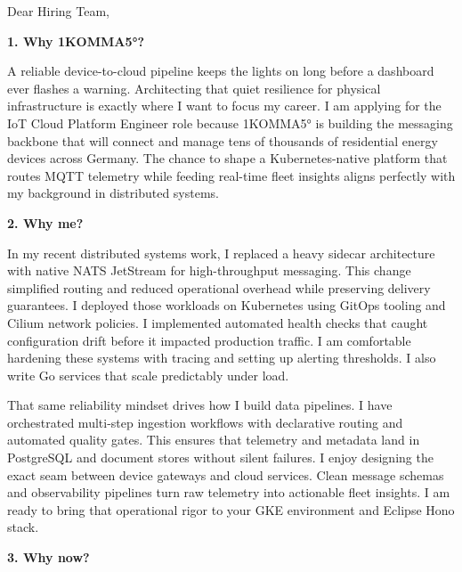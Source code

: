 \documentclass[11pt,a4paper]{coverletter}
\begin{document}

\opening{Dear Hiring Team,}

\vspace{8pt}\noindent\textbf{1. Why 1KOMMA5°?}\par\vspace{3pt}

A reliable device-to-cloud pipeline keeps the lights on long before a dashboard ever flashes a warning. Architecting that quiet resilience for physical infrastructure is exactly where I want to focus my career. I am applying for the IoT Cloud Platform Engineer role because 1KOMMA5° is building the messaging backbone that will connect and manage tens of thousands of residential energy devices across Germany. The chance to shape a Kubernetes-native platform that routes MQTT telemetry while feeding real-time fleet insights aligns perfectly with my background in distributed systems.

\vspace{8pt}\noindent\textbf{2. Why me?}\par\vspace{3pt}

In my recent distributed systems work, I replaced a heavy sidecar architecture with native NATS JetStream for high-throughput messaging. This change simplified routing and reduced operational overhead while preserving delivery guarantees. I deployed those workloads on Kubernetes using GitOps tooling and Cilium network policies. I implemented automated health checks that caught configuration drift before it impacted production traffic. I am comfortable hardening these systems with tracing and setting up alerting thresholds. I also write Go services that scale predictably under load.

That same reliability mindset drives how I build data pipelines. I have orchestrated multi-step ingestion workflows with declarative routing and automated quality gates. This ensures that telemetry and metadata land in PostgreSQL and document stores without silent failures. I enjoy designing the exact seam between device gateways and cloud services. Clean message schemas and observability pipelines turn raw telemetry into actionable fleet insights. I am ready to bring that operational rigor to your GKE environment and Eclipse Hono stack.

\vspace{8pt}\noindent\textbf{3. Why now?}\par\vspace{3pt}
\end{document}
